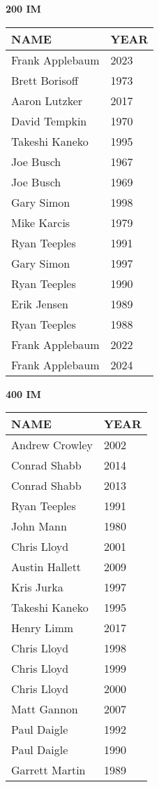 \vspace{0.4cm}

\begin{minipage}[t]{0.48\textwidth}
\centering
\textbf{200 IM}\\[0.05cm]
\begin{tabular}{@{}p{2.8cm}p{1.2cm}@{}}
\hline
\textbf{NAME} & \textbf{YEAR} \\
\hline
Frank Applebaum & 2023 \\
Brett Borisoff & 1973 \\
Aaron Lutzker & 2017 \\
David Tempkin & 1970 \\
Takeshi Kaneko & 1995 \\
Joe Busch & 1967 \\
Joe Busch & 1969 \\
Gary Simon & 1998 \\
Mike Karcis & 1979 \\
Ryan Teeples & 1991 \\
Gary Simon & 1997 \\
Ryan Teeples & 1990 \\
Erik Jensen & 1989 \\
Ryan Teeples & 1988 \\
Frank Applebaum & 2022 \\
Frank Applebaum & 2024 \\
\hline
\end{tabular}
\end{minipage}\hfill
\begin{minipage}[t]{0.48\textwidth}
\centering
\textbf{400 IM}\\[0.05cm]
\begin{tabular}{@{}p{2.8cm}p{1.2cm}@{}}
\hline
\textbf{NAME} & \textbf{YEAR} \\
\hline
Andrew Crowley & 2002 \\
Conrad Shabb & 2014 \\
Conrad Shabb & 2013 \\
Ryan Teeples & 1991 \\
John Mann & 1980 \\
Chris Lloyd & 2001 \\
Austin Hallett & 2009 \\
Kris Jurka & 1997 \\
Takeshi Kaneko & 1995 \\
Henry Limm & 2017 \\
Chris Lloyd & 1998 \\
Chris Lloyd & 1999 \\
Chris Lloyd & 2000 \\
Matt Gannon & 2007 \\
Paul Daigle & 1992 \\
Paul Daigle & 1990 \\
Garrett Martin & 1989 \\
\hline
\end{tabular}
\end{minipage}

